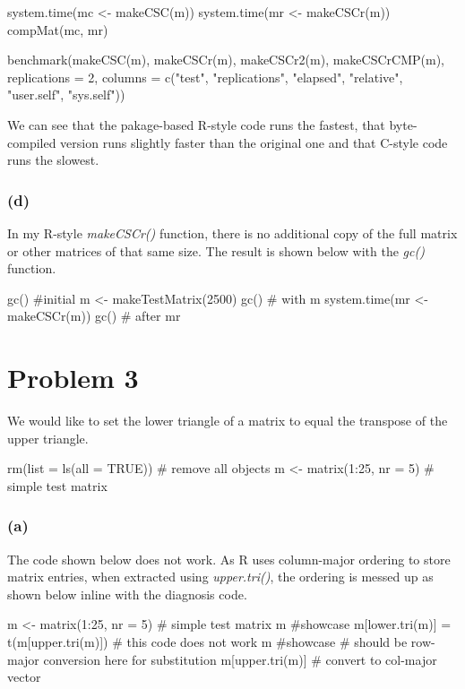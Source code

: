 \documentclass{article}
\begin{document}
system.time(mc <- makeCSC(m))
system.time(mr <- makeCSCr(m))
compMat(mc, mr)

benchmark(makeCSC(m), makeCSCr(m), makeCSCr2(m), makeCSCrCMP(m), replications = 2,
          columns = c("test", "replications", "elapsed", "relative", "user.self", "sys.self"))

We can see that the pakage-based R-style code runs the fastest, that byte-compiled version runs slightly
faster than the original one and that C-style code runs the slowest.

\subsubsection*{(d)}
In my R-style \textit{makeCSCr()} function, there is no additional copy of the full matrix or other matrices
of that same size. The result is shown below with the \textit{gc()} function.

gc() #initial
m <- makeTestMatrix(2500)
gc() # with m
system.time(mr <- makeCSCr(m))
gc() # after mr


\newpage
\section*{Problem 3}
We would like to set the lower triangle of a matrix to equal the transpose of the upper triangle.

rm(list = ls(all = TRUE)) # remove all objects
m <- matrix(1:25, nr = 5) # simple test matrix

\subsubsection*{(a)}
The code shown below does not work. As R uses column-major ordering to store matrix entries, when extracted
using \textit{upper.tri()}, the ordering is messed up as shown below inline with the diagnosis code.

m <- matrix(1:25, nr = 5) # simple test matrix
m #showcase
m[lower.tri(m)] = t(m[upper.tri(m)]) # this code does not work
m #showcase
# should be row-major conversion here for substitution
m[upper.tri(m)] # convert to col-major vector     
\end{document}
